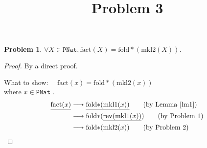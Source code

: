 \documentclass[12pt, a4paper]{article}
\title{Problem 3}
\date{\vspace{-5ex}}
\newtheorem{problem}{Problem}
\newcommand{\rmx}[1]{\mathrm{#1}}
\newcommand{\larrow}{\longrightarrow}
\newcommand{\under}{\underline}
\begin{document}
\maketitle

\begin{problem}
$\forall X \in \mathtt{PNat}, \rmx{fact}(X) = \rmx{fold*}(\rmx{mkl2}(X))$.
\end{problem}
\begin{proof}
By a direct proof.

\noindent
What to show: $\quad\rmx{fact}(x) = \rmx{fold*}(\rmx{mkl2}(x))$ \\
where $x \in \mathtt{PNat}$ .
\begin{align*}
\under{\rmx{fact}(x)}
	&\larrow \under{\rmx{fold*}(\rmx{mkl1}(x))} \tag{by Lemma~\ref{lm1}} \\
	&\larrow \rmx{fold*}(\under{\rmx{rev}(\rmx{mkl1}(x))}) \tag{by Problem 1} \\
	&\larrow \rmx{fold*}(\rmx{mkl2}(x)) \tag{by Problem 2}
\end{align*}
\end{proof}
\end{document}

